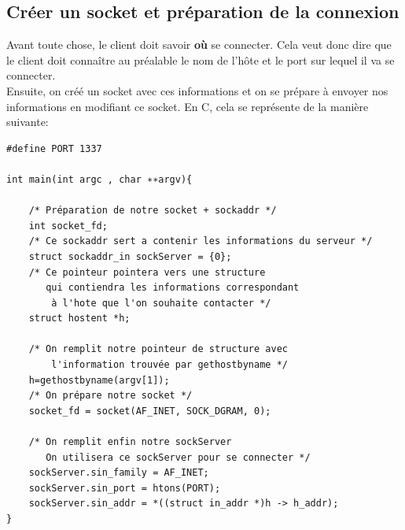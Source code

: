 \documentclass{report}
\begin{document}
\subsection{Créer un socket et préparation de la connexion}
Avant toute chose, le client doit savoir \textbf{où} se connecter. Cela veut donc dire que le client doit connaître au préalable le nom de l'hôte et le port sur lequel il va se connecter.\\
Ensuite, on créé un socket avec ces informations et on se prépare à envoyer nos informations en modifiant ce socket. En C, cela se représente de la manière suivante:
\begin{lstlisting}
#define PORT 1337

int main(int argc , char ∗∗argv){

	/* Préparation de notre socket + sockaddr */
	int socket_fd;
	/* Ce sockaddr sert a contenir les informations du serveur */
	struct sockaddr_in sockServer = {0};
	/* Ce pointeur pointera vers une structure
	   qui contiendra les informations correspondant
	    à l'hote que l'on souhaite contacter */
	struct hostent *h;
	
	/* On remplit notre pointeur de structure avec
	    l'information trouvée par gethostbyname */
	h=gethostbyname(argv[1]);
	/* On prépare notre socket */
	socket_fd = socket(AF_INET, SOCK_DGRAM, 0);
	
	/* On remplit enfin notre sockServer
	   On utilisera ce sockServer pour se connecter */
	sockServer.sin_family = AF_INET;
	sockServer.sin_port = htons(PORT);
	sockServer.sin_addr = *((struct in_addr *)h -> h_addr);
}
\end{lstlisting}
\end{document}
